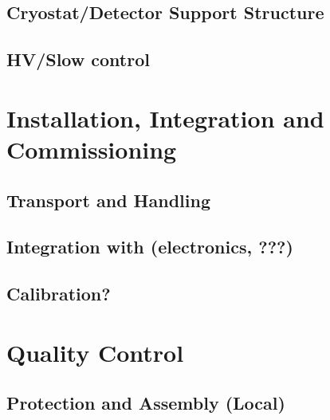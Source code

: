 \subsection{Cryostat/Detector Support Structure}
\label{sec:fddp-crp-intfc-support}

\subsection{HV/Slow control}
\label{sec:fddp-crp-intfc-HV-slowcontrol}


\section{Installation, Integration and Commissioning}
\label{sec:fddp-crp-install}

\subsection{Transport and Handling}
\label{sec:fddp-crp-install-transport}


\subsection{Integration with (electronics, ???)}
\label{sec:fddp-crp-install-pd-???}


\subsection{Calibration?}
\label{sec:fddp-crp-install-calib}



\section{Quality Control}
\label{sec:fddp-crp-qc}

\subsection{Protection and Assembly (Local)}
\label{sec:fddp-crp-qc-local}


